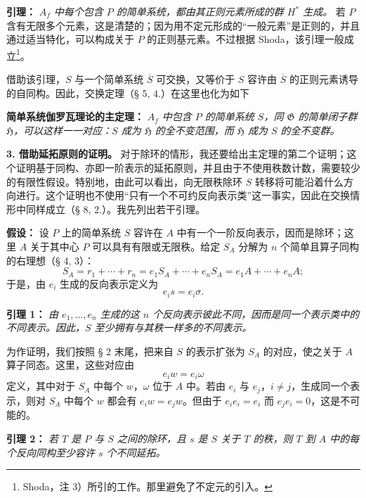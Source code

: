 \documentclass[11pt]{article}
\providecommand{\srcspaced}[1]{#1}
\providecommand{\glqq}{“}
\providecommand{\grqq}{”}
\providecommand{\Gcal}{\mathfrak G}
\begin{document}
\noindent\textbf{\srcspaced{引理：}} \emph{\(A_f\) 中每个包含 \(P\) 的简单系统，都由其正则元素所成的群 \(H^*\) 生成。} 若 \(P\) 含有无限多个元素，这是清楚的；因为用不定元形成的\glqq{}一般元素\grqq{}是正则的，并且通过适当特化，可以构成关于 \(P\) 的正则基元素。不过根据 Shoda，该引理一般成立\footnote{Shoda，注 3）所引的工作。那里避免了不定元的引入。}。

借助该引理，\(S\) 与一个简单系统 \(\overline S\) 可交换，又等价于 \(S\) 容许由 \(\overline S\) 的正则元素诱导的自同构。因此，交换定理（§ 5, 4.）在这里也化为如下

\noindent\textbf{\srcspaced{简单系统伽罗瓦理论的主定理：}} \emph{\(A_f\) 中包含 \(P\) 的简单系统 \(S\)，同 \(\Gcal\) 的简单闭子群 \(\mathfrak H\)，可以这样一一对应：\(S\) 成为 \(\mathfrak H\) 的全不变范围，而 \(\mathfrak H\) 成为 \(S\) 的全不变群。}

\noindent\textbf{\srcspaced{3. 借助延拓原则的证明。}}
对于除环的情形，我还要给出主定理的第二个证明；这个证明基于同构、亦即一阶表示的延拓原则，并且由于不使用秩数计数，需要较少的有限性假设。特别地，由此可以看出，向无限秩除环 \(S\) 转移将可能沿着什么方向进行。这个证明也不使用“只有一个不可约反向表示类”这一事实，因此在交换情形中同样成立（§ 8, 2.）。我先列出若干引理。

\noindent\textbf{\srcspaced{假设：}} 设 \(P\) 上的简单系统 \(S\) 容许在 \(A\) 中有一个一阶反向表示，因而是除环；这里 \(A\) 关于其中心 \(P\) 可以具有有限或无限秩。给定 \(S_A\) 分解为 \(n\) 个简单且算子同构的右理想（§ 4, 3）：
\[
        S_A=r_1+\cdots+r_n
            =e_1S_A+\cdots+e_nS_A
            =e_1A+\cdots+e_nA ;
\]
于是，由 \(e_i\) 生成的反向表示定义为
\[
        e_i s=e_i\sigma .
\]

\noindent\textbf{\srcspaced{引理 1：}} \emph{由 \(e_1,\ldots,e_n\) 生成的这 \(n\) 个反向表示彼此不同，因而是同一个表示类中的不同表示。因此，\(S\) 至少拥有与其秩一样多的不同表示。}

为作证明，我们按照 § 2 末尾，把来自 \(S\) 的表示扩张为 \(S_A\) 的对应，使之关于 \(A\) 算子同态。这里，这些对应由
\[
        e_i w=e_i\omega
\]
定义，其中对于 \(S_A\) 中每个 \(w\)，\(\omega\) 位于 \(A\) 中。若由 \(e_i\) 与 \(e_j\)，\(i\ne j\)，生成同一个表示，则对 \(S_A\) 中每个 \(w\) 都会有 \(e_iw=e_jw\)。但由于 \(e_ie_i=e_i\) 而 \(e_je_i=0\)，这是不可能的。

\noindent\textbf{\srcspaced{引理 2：}} \emph{若 \(T\) 是 \(P\) 与 \(S\) 之间的除环，且 \(s\) 是 \(S\) 关于 \(T\) 的秩，则 \(T\) 到 \(A\) 中的每个反向同构至少容许 \(s\) 个不同延拓。}
\end{document}
